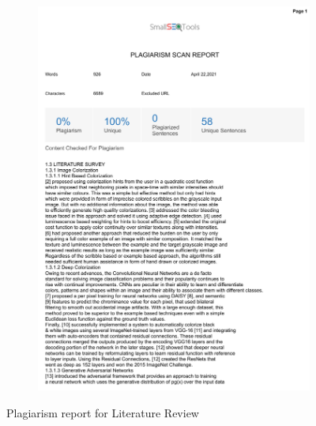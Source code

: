 \documentclass[oneside,a4paper,12pt]{report}
\begin{document}
\begin{appendices}
\begin{figure}
	\begin{subfigure}[H]{\textwidth}
		\centering
    	\includegraphics[scale=0.7, page=1]{plagiarism/literature_survey.pdf}
    \end{subfigure}
 \caption{Plagiarism report for Literature Review}
    \label{PlagiarismLitSurvey1}
\end{figure}
\begin{figure}\ContinuedFloat
    \begin{subfigure}[H]{\textwidth}
    	\centering

\end{subfigure}
\end{figure}
\end{appendices}
\end{document}
